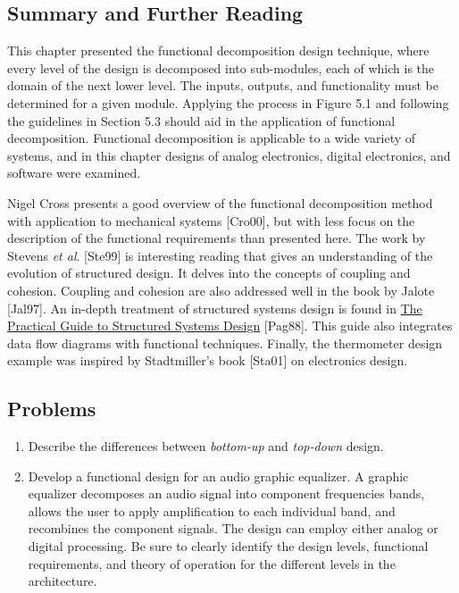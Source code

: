 \subsection{Summary and Further
Reading}\label{summary-and-further-reading}

This chapter presented the functional decomposition design technique,
where every level of the design is decomposed into sub-modules, each of
which is the domain of the next lower level. The inputs, outputs, and
functionality must be determined for a given module. Applying the
process in Figure 5.1 and following the guidelines in Section 5.3 should
aid in the application of functional decomposition. Functional
decomposition is applicable to a wide variety of systems, and in this
chapter designs of analog electronics, digital electronics, and software
were examined.

Nigel Cross presents a good overview of the functional decomposition
method with application to mechanical systems {[}Cro00{]}, but with less
focus on the description of the functional requirements than presented
here. The work by Stevens \emph{et al}. {[}Ste99{]} is interesting
reading that gives an understanding of the evolution of structured
design. It delves into the concepts of coupling and cohesion. Coupling
and cohesion are also addressed well in the book by Jalote {[}Jal97{]}.
An in-depth treatment of structured systems design is found in \ul{The
Practical Guide to Structured Systems Design} {[}Pag88{]}. This guide
also integrates data flow diagrams with functional techniques. Finally,
the thermometer design example was inspired by Stadtmiller's book
{[}Sta01{]} on electronics design.

\subsection{Problems}\label{problems}

\begin{enumerate}
\def\labelenumi{\arabic{enumi}.}
\item
  Describe the differences between \emph{bottom-up} and \emph{top-down}
  design.
\item
  Develop a functional design for an audio graphic equalizer. A graphic
  equalizer decomposes an audio signal into component frequencies bands,
  allows the user to apply amplification to each individual band, and
  recombines the component signals. The design can employ either analog
  or digital processing. Be sure to clearly identify the design levels,
  functional requirements, and theory of operation for the different
  levels in the architecture.
\end{enumerate}

